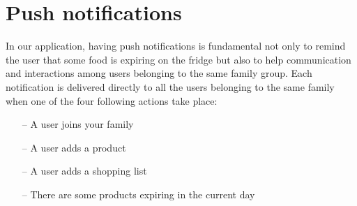 \section{Push notifications}
In our application, having push notifications is fundamental not only to remind the user that some food is expiring on the fridge but also to help communication and interactions among users belonging to the same family group. Each notification is delivered directly to all the users belonging to the same family when one of the four following actions take place:

\begin{itemize}
    \item[--] A user joins your family
    \item[--] A user adds a product
    \item[--] A user adds a shopping list
    \item[--] There are some products expiring in the current day
\end{itemize}


